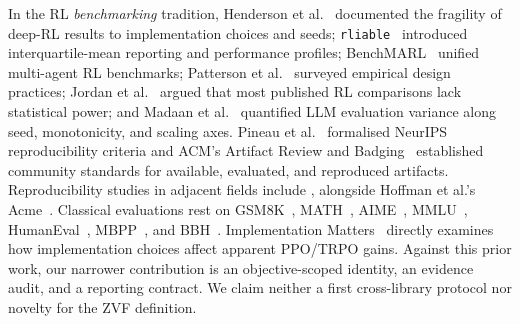 In the RL \emph{benchmarking} tradition, Henderson et
al.~\cite{henderson2018deep} documented the fragility of deep-RL results
to implementation choices and seeds;
\texttt{rliable}~\cite{agarwal2021deep} introduced interquartile-mean
reporting and performance profiles; BenchMARL~\cite{bettini2023benchmarl}
unified multi-agent RL benchmarks; Patterson et
al.~\cite{patterson2024empirical} surveyed empirical design practices;
Jordan et al.~\cite{jordan2024benchmarking} argued that most published RL
comparisons lack statistical power; and Madaan et
al.~\cite{zhang2024benchvariance} quantified LLM evaluation variance along
seed, monotonicity, and scaling axes. Pineau et
al.~\cite{pineau2020improving} formalised NeurIPS reproducibility criteria
and ACM's Artifact Review and Badging~\cite{acm2020badges} established
community standards for available, evaluated, and reproduced artifacts.
Reproducibility studies in adjacent fields include
\cite{cavenaghi2023systematic, lynnerup2019survey, yamerenko2025generating, paparella2023reproducibility, huang2022state, lopezibanez2021reproducibility, leeser2026artifact, sedghpour2024artifact, colas2019hitchhiker}, alongside
Hoffman et al.'s Acme~\cite{hoffman2022acme}. Classical evaluations rest on
GSM8K~\cite{cobbe2021training}, MATH~\cite{hendrycks2021math},
AIME~\cite{maa2024aime}, MMLU~\cite{hendrycks2021mmlu},
HumanEval~\cite{chen2021codex}, MBPP~\cite{austin2021mbpp}, and
BBH~\cite{suzgun2023bbh}. Implementation Matters~\cite{engstrom2020implementation}
directly examines how implementation choices affect apparent PPO/TRPO gains.
Against this prior work, our narrower contribution is an objective-scoped
identity, an evidence audit, and a reporting contract. We claim neither a first
cross-library protocol nor novelty for the ZVF definition.

